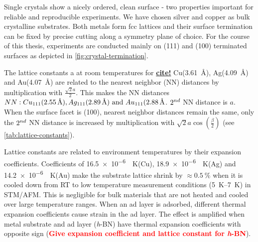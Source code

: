 Single crystals show a nicely ordered, clean surface - two properties important for reliable and reproducible experiments. We have chosen silver and copper as bulk crystalline substrates. Both metals form fcc lattices and their surface termination can be fixed by precise cutting along a symmetry plane of choice. For the course of this thesis, experiments are conducted mainly on (111) and (100) terminated surfaces as depicted in \autoref{fig:crystal-termination}.

The lattice constants a at room temperatures for \underline{\textbf{cite!}} Cu(\SI{3,61}{\angstrom}), Ag(\SI{4,09}{\angstrom}) and Au(\SI{4,07}{\angstrom}) are related to the nearest neighbor (NN) distances by multiplication with $\frac{\sqrt{2}a}{2}$. This makes the NN distances $NN: Cu_{111}(\SI{2,55}{\angstrom}), Ag_{111}(\SI{2,89}{\angstrom})\textnormal{ and } Au_{111}(\SI{2,88}{\angstrom}$. $\textnormal{2}^{nd}$ NN distance is $a$. When the surface facet is (100), nearest neighbor distances remain the same, only the $\textnormal{2}^{nd}$ NN distance is increased by multiplication with $\sqrt{2}a\cos(\frac{\beta}{2})$ (see \autoref{tab:lattice-constants}).

Lattice constants are related to environment temperatures by their expansion coefficients.
Coefficients of \SI{16,5e-6}{\per \kelvin}(Cu), \SI{18,9e-6}{\per \kelvin}(Ag) and \SI{14,2e-6}{\per \kelvin}(Au) make the substrate lattice shrink by $\approx \SI{0,5}{\percent}$ when it is cooled down from RT to low temperature measurement conditions (\SIrange{5}{7}{\kelvin}) in STM/AFM. This is negligible for bulk materials that are not heated and cooled over large temperature ranges. When an ad layer is adsorbed, different thermal expansion coefficients cause strain in the ad layer. The effect is amplified when metal substrate and ad layer (\textit{h}-BN)
have thermal expansion coefficients with opposite sign (\textcolor{red}{\textbf{Give expansion coefficient and lattice constant for \textit{h}-BN}}).\cite{farwick_zum_hagen_structure_2016}

